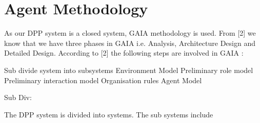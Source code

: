 \section{Agent Methodology}

As our DPP system is a closed system, GAIA methodology is used. From [2]  we know that we have three phases in GAIA i.e. Analysis, Architecture Design and Detailed Design. According to [2] the following steps are involved in GAIA :

Sub divide system into subsystems 
Environment Model
Preliminary role model
Preliminary interaction model
Organisation rules
Agent Model


Sub Div: 

The DPP system is divided into systems. The sub systems include 


 